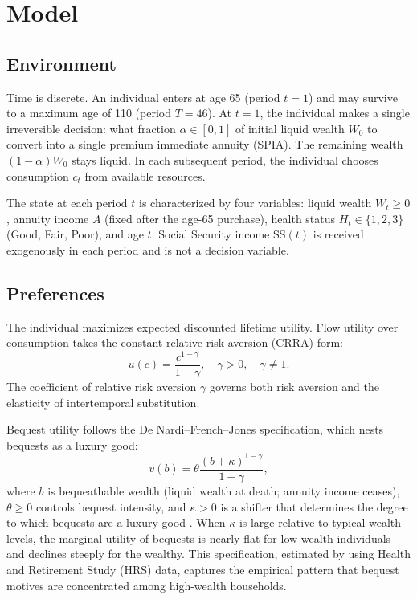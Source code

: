 \documentclass[12pt]{article}
\begin{document}
\section{Model}
\label{sec:model}

\subsection{Environment}

Time is discrete. An individual enters at age 65 (period $t = 1$) and may survive to a maximum age of 110 (period $T = 46$). At $t = 1$, the individual makes a single irreversible decision: what fraction $\alpha \in [0, 1]$ of initial liquid wealth $W_0$ to convert into a single premium immediate annuity (SPIA). The remaining wealth $(1 - \alpha)W_0$ stays liquid. In each subsequent period, the individual chooses consumption $c_t$ from available resources.

The state at each period $t$ is characterized by four variables: liquid wealth $W_t \geq 0$, annuity income $A$ (fixed after the age-65 purchase), health status $H_t \in \{1, 2, 3\}$ (Good, Fair, Poor), and age $t$. Social Security income $\text{SS}(t)$ is received exogenously in each period and is not a decision variable.

\subsection{Preferences}

The individual maximizes expected discounted lifetime utility. Flow utility over consumption takes the constant relative risk aversion (CRRA) form:
\begin{equation}
\label{eq:utility}
u(c) = \frac{c^{1-\gamma}}{1-\gamma}, \quad \gamma > 0, \quad \gamma \neq 1.
\end{equation}
The coefficient of relative risk aversion $\gamma$ governs both risk aversion and the elasticity of intertemporal substitution.

Bequest utility follows the De Nardi--French--Jones specification, which nests bequests as a luxury good:
\begin{equation}
\label{eq:bequest}
v(b) = \theta \frac{(b + \kappa)^{1-\gamma}}{1-\gamma},
\end{equation}
where $b$ is bequeathable wealth (liquid wealth at death; annuity income ceases), $\theta \geq 0$ controls bequest intensity, and $\kappa > 0$ is a shifter that determines the degree to which bequests are a luxury good \citep{denardi2004}. When $\kappa$ is large relative to typical wealth levels, the marginal utility of bequests is nearly flat for low-wealth individuals and declines steeply for the wealthy. This specification, estimated by \citet{lockwood2012} using Health and Retirement Study (HRS) data, captures the empirical pattern that bequest motives are concentrated among high-wealth households.
\end{document}
